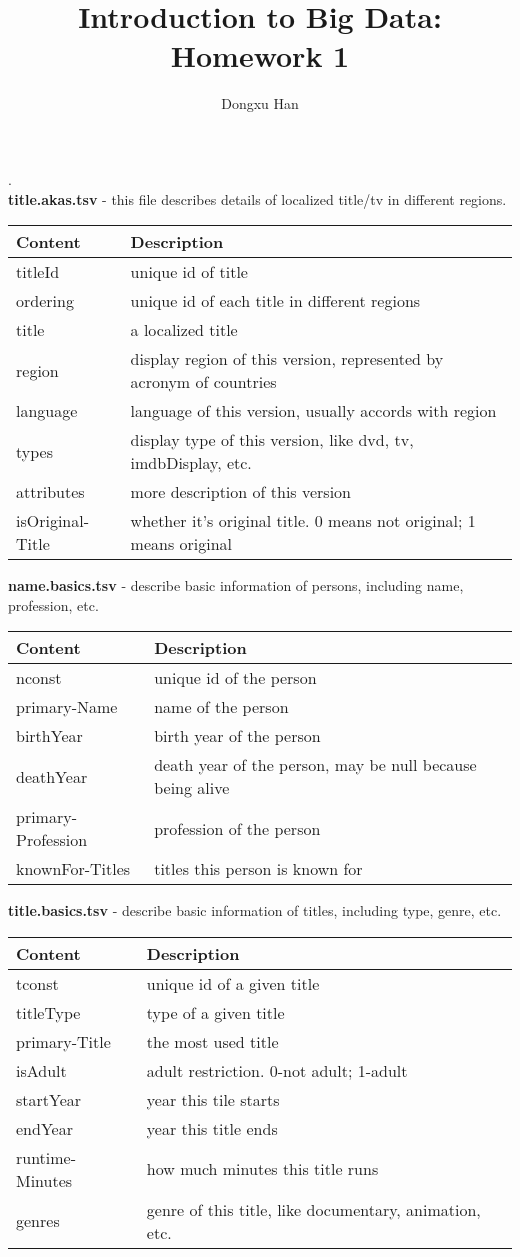 \documentclass[a4paper]{article}
\title{Introduction to Big Data: Homework 1}
\author{Dongxu Han}
\date{}
\begin{document}
\maketitle
\setlength{\parskip}{-0.5em}
\Large
{}.\\
\textbf{title.akas.tsv} - this file describes details of    localized title/tv in different regions.
\begin{longtable}[l]{p{2.5cm}|p{10.5cm}}
\hline
Content & Description \\ \hline
titleId & unique id of title \\ \hline
ordering & unique id of each title in different regions \\ \hline
title & a localized title \\ \hline
region & display region of this version, represented by acronym of countries \\ \hline
language & language of this version, usually accords with region \\ \hline
types & display type of this version, like dvd, tv, imdbDisplay, etc. \\ \hline
attributes & more description of this version \\ \hline
isOriginal-Title & whether it's original title. 0 means not original; 1 means original \\ \hline
\end{longtable}
\noindent
\textbf{name.basics.tsv} - describe basic information of persons, including name, profession, etc.
\begin{longtable}[l]{p{2.5cm}|p{10.5cm}}
\hline
Content & Description \\ \hline
nconst & unique id of the person \\ \hline
primary-Name & name of the person \\ \hline
birthYear & birth year of the person \\ \hline
deathYear & death year of the person, may be null because being alive \\ \hline
primary-Profession & profession of the person \\ \hline
knownFor-Titles & titles this person is known for \\ \hline
\end{longtable}
\noindent
\textbf{title.basics.tsv} - describe basic information of titles, including type, genre, etc.
\begin{longtable}[l]{p{2.5cm}|p{10.5cm}}
\hline
Content & Description \\ \hline
tconst & unique id of a given title \\ \hline
titleType & type of a given title \\ \hline
primary-Title & the most used title \\ \hline
isAdult & adult restriction. 0-not adult; 1-adult \\ \hline
startYear & year this tile starts \\ \hline
endYear & year this title ends \\ \hline
runtime-Minutes & how much minutes this title runs \\ \hline
genres & genre of this title, like documentary, animation, etc. \\ \hline
\end{longtable}
\end{document}
